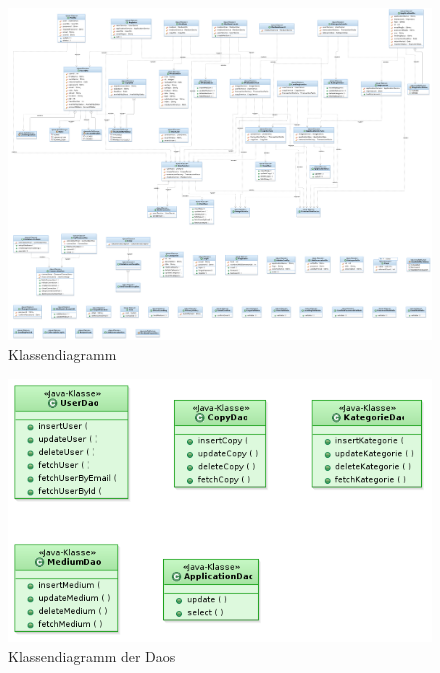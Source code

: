 \documentclass{article}
\begin{document}
    \begin{figure}[H]
        \includegraphics[scale=0.2]{Klassendiagramm.png}
        \caption{Klassendiagramm}
        \label{fig:Klassendiagramm}
    \end{figure}

    \begin{figure}[H]
        \includegraphics[scale=0.6]{KlassendiagramDao.png}
        \caption{Klassendiagramm der Daos}
        \label{fig:KlassendiagramDao}
    \end{figure}
\end{document}
